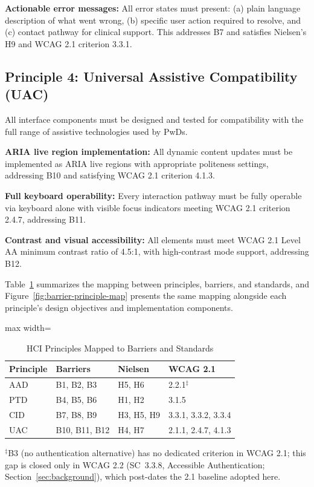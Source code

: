 \documentclass[journal,onecolumn]{IEEEtran}
\begin{document}
\textbf{Actionable error messages:} All error states must present: (a) plain language description of what went wrong, (b) specific user action required to resolve, and (c) contact pathway for clinical support. This addresses B7 and satisfies Nielsen's H9 and WCAG 2.1 criterion 3.3.1.

\subsection{Principle 4: Universal Assistive Compatibility (UAC)}

All interface components must be designed and tested for compatibility with the full range of assistive technologies used by PwDs.

\textbf{ARIA live region implementation:} All dynamic content updates must be implemented as ARIA live regions with appropriate politeness settings, addressing B10 and satisfying WCAG 2.1 criterion 4.1.3.

\textbf{Full keyboard operability:} Every interaction pathway must be fully operable via keyboard alone with visible focus indicators meeting WCAG 2.1 criterion 2.4.7, addressing B11.

\textbf{Contrast and visual accessibility:} All elements must meet WCAG 2.1 Level AA minimum contrast ratio of 4.5:1, with high-contrast mode support, addressing B12.

Table~\ref{tab:principles} summarizes the mapping between principles, barriers, and standards, and Figure~\ref{fig:barrier-principle-map} presents the same mapping alongside each principle's design objectives and implementation components.

\begin{table}[htbp]
\caption{HCI Principles Mapped to Barriers and Standards}
\label{tab:principles}
\begin{center}
\small
\begin{adjustbox}{max width=\columnwidth}
\begin{tabular}{|p{1.3cm}|p{1.3cm}|p{1.5cm}|p{1.5cm}|}
\hline
\textbf{Principle} & \textbf{Barriers} & \textbf{Nielsen} & \textbf{WCAG 2.1} \\
\hline
AAD & B1, B2, B3 & H5, H6 & 2.2.1$^{\ddagger}$ \\
\hline
PTD & B4, B5, B6 & H1, H2 & 3.1.5 \\
\hline
CID & B7, B8, B9 & H3, H5, H9 & 3.3.1, 3.3.2, 3.3.4 \\
\hline
UAC & B10, B11, B12 & H4, H7 & 2.1.1, 2.4.7, 4.1.3 \\
\hline
\end{tabular}
\end{adjustbox}
{\footnotesize $^{\ddagger}$B3 (no authentication alternative) has no dedicated criterion in WCAG 2.1; this gap is closed only in WCAG 2.2 (SC~3.3.8, Accessible Authentication; Section~\ref{sec:background}), which post-dates the 2.1 baseline adopted here.}
\end{center}
\end{table}
\end{document}

